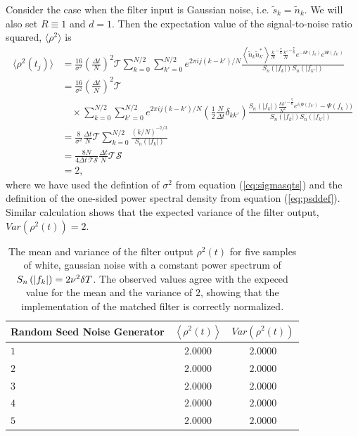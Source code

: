 Consider the case when the filter input is Gaussian noise, i.e. $\tilde{s}_k =
\tilde{n}_k$.  We will also set $R\equiv 1$ and $d = 1$.  Then the expectation
value of the signal-to-noise ratio squared, $\langle \rho^2
\rangle$ is
\begin{equation}
\begin{split}
\langle \rho^2(t_j) \rangle &=
\frac{16}{\sigma^2}\left(\frac{\Delta t}{N}\right)^2 \mathcal{T}
  \sum_{k=0}^{N/2} \sum_{k'=0}^{N/2} 
  e^{2\pi ij(k-k')/N} 
  \frac{\left\langle \tilde{n}_k \tilde{n}_{k'}^{\ast} \right\rangle 
        \frac{k}{N}^{-\frac{7}{6}} \frac{k'}{N}^{-\frac{7}{6}}
        e^{-i\Psi(f_k)} e^{i\Psi(f_{k'})}}
       {S_n\left(\left|f_k\right|\right)S_n\left(\left|f_{k'}\right|\right)} \\
&= 
\frac{16}{\sigma^2}\left(\frac{\Delta t}{N}\right)^2 \mathcal{T} \\
&\quad\times
  \sum_{k=0}^{N/2} \sum_{k'=0}^{N/2} 
  e^{2\pi ij(k-k')/N} \left(\frac{1}{2} \frac{N}{\Delta t}  \delta_{kk'} \right) 
  \frac{ S_n\left(\left|f_k\right|\right)
        \frac{kk'}{N^2}^{-\frac{7}{6}}
        e^{i ( \Psi(f_{k'})} - \Psi(f_k) )}
       {S_n\left(\left|f_k\right|\right)S_n\left(\left|f_{k'}\right|\right)} \\
&= 
\frac{8}{\sigma^2} \frac{\Delta t}{N} \mathcal{T}
  \sum_{k=0}^{N/2}
  \frac{ (k/N)^{-7/3} }
       {S_n\left(\left|f_k\right|\right)} \\
&= 
\frac{8N}{4\Delta t\, \mathcal{T}\mathcal{S}} \frac{\Delta t}{N} \mathcal{T} \mathcal{S} \\
&= 2,
\label{eq:filternorm}
\end{split}
\end{equation}
where we have used the defintion of $\sigma^2$ from equation
(\ref{eq:sigmasqts}) and the definition of the one-sided power spectral
density from equation (\ref{eq:psddef}). Similar calculation shows that 
the expected variance of the filter output, $Var( \rho^2(t) ) = 2$. 
\begin{table}[htb]
  \begin{center}
  \begin{tabular}{l|c|c}
  Random Seed Noise Generator& $\left\langle \rho^2(t) \right\rangle$ & $Var( \rho^2(t) )$\\
  \hline
  $1$ & $2.0000$ & $2.0000$ \\
  $2$ & $2.0000$ & $2.0000$ \\
  $3$ & $2.0000$ & $2.0000$ \\
  $4$ & $2.0000$ & $2.0000$ \\
  $5$ & $2.0000$ & $2.0000$ \\
  \end{tabular}
  \end{center}
  \caption{%
  The mean and variance of the filter output $\rho^2(t)$ for five samples of
  white, gaussian noise with a comstant power spectrum of $S_n\left(\left|f_{k}\right|\right) =
  2\nu^2\delta T$. The observed values agree with the expeced value for the
  mean and the variance of $2$, showing that the implementation of the matched
  filter is correctly normalized.
  }
\label{t:normresults}
\end{table}

